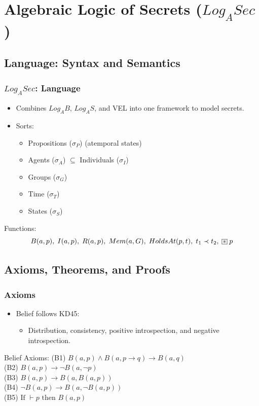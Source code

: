 \documentclass[aspectratio=169]{beamer}
\newcommand{\BoxStar}{\fboxsep=1pt\fbox{$\ast$}}
\begin{document}
\section{Algebraic Logic of Secrets ($Log_ASec$)}

\subsection{Language: Syntax and Semantics}
\begin{frame}
\frametitle{$Log_ASec$: Language}
\begin{itemize}
    \item Combines $Log_AB$, $Log_AS$, and VEL into one framework to model secrets.
    \item Sorts:
    \begin{itemize}
        \item Propositions ($\sigma_P$) (atemporal states)
        \item Agents ($\sigma_A$) $\subseteq$ Individuals ($\sigma_I$)
        \item Groups ($\sigma_G$)
        \item Time ($\sigma_T$)
        \item States ($\sigma_S$)
    \end{itemize}
\end{itemize}
\begin{block}{Functions:}
\[
B(a, p), \; I(a, p), \; R(a, p), \;
Mem(a, G), \; HoldsAt(p, t), \; t_1 \prec t_2, \; \BoxStar \; p
\]
\end{block}
\end{frame}

\subsection{Axioms, Theorems, and Proofs}
\begin{frame}
\frametitle{Axioms}
\Large 
\begin{itemize}
    \item Belief follows KD45:
    \begin{itemize}
        \Large 
        \item Distribution, consistency, positive introspection, and negative introspection.
    \end{itemize}
\end{itemize}
\begin{block}{Belief Axioms:}
    \Large
    \normalfont
    (B1) $B(a, p) \wedge B(a, p \rightarrow q) \rightarrow B(a, q)$ \\
    (B2) $B(a, p) \rightarrow \neg B(a, \neg p)$ \\
    (B3) $B(a, p) \rightarrow B(a, B(a, p))$ \\
    (B4) $\neg B(a, p) \rightarrow B(a, \neg B(a, p))$ \\    
    (B5) $\text{If } \vdash p \text{ then } B(a, p)$
\end{block}
\end{frame}
\end{document}
